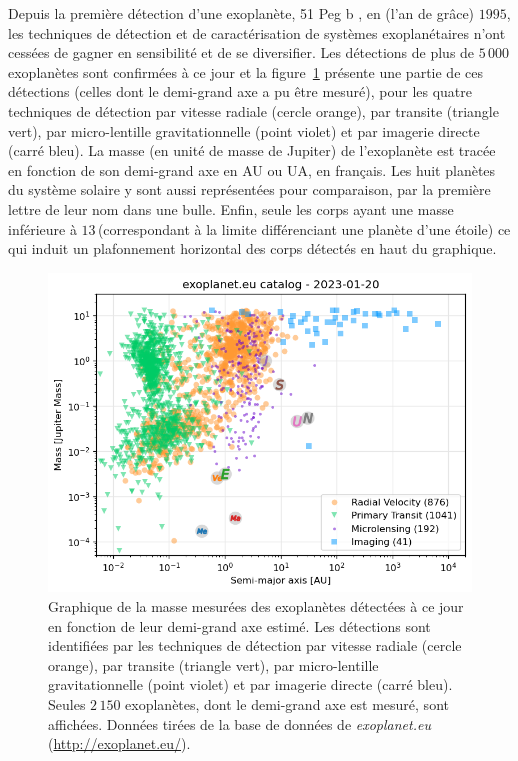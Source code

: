 Depuis la première détection d'une exoplanète, 51 Peg b \citep{mayor1995}, en (l'an de grâce) $1995$, les techniques de détection et de caractérisation de systèmes exoplanétaires n'ont cessées de gagner en sensibilité et de se diversifier. Les détections de plus de $5\,000$ exoplanètes sont confirmées à ce jour et la figure~\ref{fig:ExoplanetDetection} présente une partie de ces détections (celles dont le demi-grand axe a pu être mesuré), pour les quatre techniques de détection par vitesse radiale (cercle orange), par transite (triangle vert), par micro-lentille gravitationnelle (point violet) et par imagerie directe (carré bleu). La masse (en unité de masse de Jupiter) de l'exoplanète est tracée en fonction de son demi-grand axe en \ac{AU} ou \ac{UA}, en français. Les huit planètes du système solaire y sont aussi représentées pour comparaison, par la première lettre de leur nom dans une bulle. Enfin, seule les corps ayant une masse inférieure à $13 \,$\MJ (correspondant à la limite différenciant une planète d'une étoile) ce qui induit un plafonnement horizontal des corps détectés en haut du graphique.

\begin{figure}[ht!]
    \centering
    \includegraphics[width=\figwidth]{Figure_Chap1/20230120_exoplanet_diagram_RV_PT_ML_IM.png}
    \caption[Graphique des exoplanètes détectées à ce jour suivant les quatre techniques de détection principales.]{Graphique de la masse mesurées des exoplanètes détectées à ce jour en fonction de leur demi-grand axe estimé. Les détections sont identifiées par les techniques de détection par vitesse radiale (cercle orange), par transite (triangle vert), par micro-lentille gravitationnelle (point violet) et par imagerie directe (carré bleu). Seules $2\,150$ exoplanètes, dont le demi-grand axe est mesuré, sont affichées. Données tirées de la base de données de \textit{exoplanet.eu} (\url{http://exoplanet.eu/}).}
    \label{fig:ExoplanetDetection}
\end{figure}

